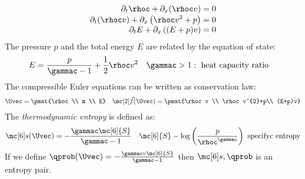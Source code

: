 \begin{examplebox}\nospacing
    \begin{example}\label{example:compressible_euler_equations_entropy_pair}
        \begin{align}
          \partial_{t}\rhoc+\partial_{x}(\rhoc v)&=0 \\[-1\jot]
          \partial_{t}(\rhoc v)+\partial_{x}\left(\rhoc v^{2}+p\right)&=0 \\[-1\jot]
          \partial_{t}E+\partial_{x}\left((E+p)v\right)&=0
        \end{align}
        The pressure $p$ and the total energy $E$ are related by the equation of state:
        \begin{align}
          &E=\frac{p}{\gammac-1}+\frac{1}{2}\rhoc v^{2}&&\gammac>1: \text{ heat capacity ratio}
        \end{align}
        The compressible Euler equations can be written as conservation law:
        \begin{align*}
          \Uvec=\pmat{\rhoc \\ m \\ E}&&
          \fluxvec(\Uvec)=\pmat{\rhoc v \\  \rhoc v^{2}+p\\ (E+p)v}
        \end{align*}
        The \textit{thermodynamic entropy} is defined as:
        \begin{align}
          \entropy(\Uvec)=-\frac{\gammac\mc[6]{S}}{\gammac-1}&&\mc[6]{S}-\log \left(\frac{p}{\rhoc^{\gammac}}\right)\text{ specifyc entropy}
        \end{align}
        If we define $\qprob(\Uvec)=-\frac{\gammac v \mc[6]{S} }{\gammac-1}$ then $\entropy,\qprob$ is an entropy pair.
    \end{example}
\end{examplebox}

